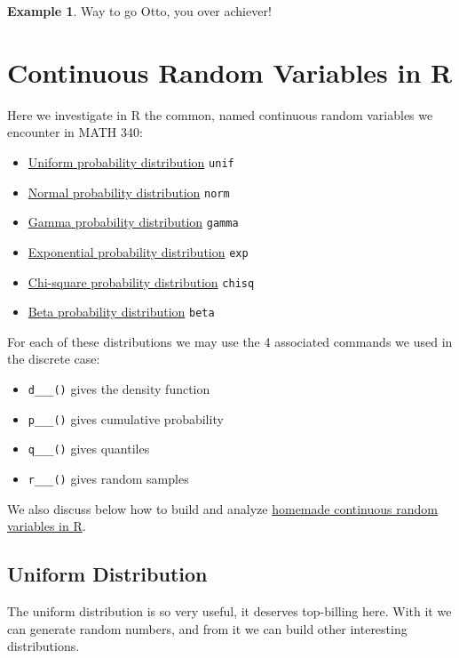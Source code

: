 \documentclass[
]{book}
\providecommand{\tightlist}{%
  \setlength{\itemsep}{0pt}\setlength{\parskip}{0pt}}
\theoremstyle{definition}
\theoremstyle{definition}
\newtheorem{example}{Example}[chapter]
\theoremstyle{definition}
\theoremstyle{definition}
\theoremstyle{remark}
\begin{document}
\begin{example}
Way to go Otto, you over achiever!

\end{example}

\chapter{Continuous Random Variables in R}\label{R-continuousRV}

Here we investigate in R the common, named continuous random variables we encounter in MATH 340:

\begin{itemize}
\tightlist
\item
  \hyperref[unifR]{Uniform probability distribution} \textbar{} \texttt{unif}
\item
  \hyperref[normalR]{Normal probability distribution} \textbar{} \texttt{norm}
\item
  \hyperref[gammaR]{Gamma probability distribution} \textbar{} \texttt{gamma}
\item
  \hyperref[expR]{Exponential probability distribution} \textbar{} \texttt{exp}
\item
  \hyperref[chiR]{Chi-square probability distribution} \textbar{} \texttt{chisq}
\item
  \hyperref[betaR]{Beta probability distribution} \textbar{} \texttt{beta}
\end{itemize}

For each of these distributions we may use the 4 associated commands we used in the discrete case:

\begin{itemize}
\tightlist
\item
  \texttt{d\_\_\_()} gives the density function
\item
  \texttt{p\_\_\_()} gives cumulative probability
\item
  \texttt{q\_\_\_()} gives quantiles
\item
  \texttt{r\_\_\_()} gives random samples
\end{itemize}

We also discuss below how to build and analyze \hyperref[custom-continuous-R]{homemade continuous random variables in R}.

\section{Uniform Distribution}\label{unifR}

The uniform distribution is so very useful, it deserves top-billing here. With it we can generate random numbers, and from it we can build other interesting distributions.
\end{document}
